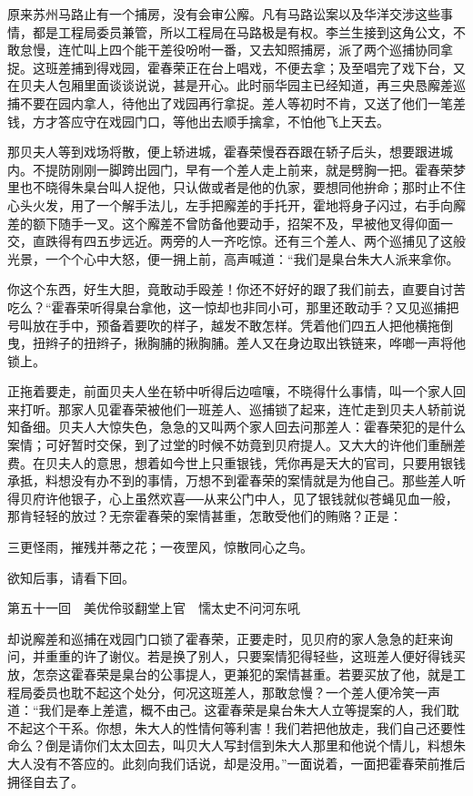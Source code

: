 \documentclass[12pt,UTF8]{ctexbook}
\begin{document}
{{{原来苏州马路止有一个捕房，没有会审公廨。凡有马路讼案以及华洋交涉这些事情，都是工程局委员兼管，所以工程局在马路极是有权。李兰生接到这角公文，不敢怠慢，连忙叫上四个能干差役吩咐一番，又去知照捕房，派了两个巡捕协同拿捉。这班差捕到得戏园，霍春荣正在台上唱戏，不便去拿；及至唱完了戏下台，又在贝夫人包厢里面谈谈说说，甚是开心。此时丽华园主已经知道，再三央恳廨差巡捕不要在园内拿人，待他出了戏园再行拿捉。差人等初时不肯，又送了他们一笔差钱，方才答应守在戏园门口，等他出去顺手擒拿，不怕他飞上天去。

那贝夫人等到戏场将散，便上轿进城，霍春荣慢吞吞跟在轿子后头，想要跟进城内。不提防刚刚一脚跨出园门，早有一个差人走上前来，就是劈胸一把。霍春荣梦里也不晓得朱臬台叫人捉他，只认做或者是他的仇家，要想同他拚命；那时止不住心头火发，用了一个解手法儿，左手把廨差的手托开，霍地将身子闪过，右手向廨差的额下随手一叉。这个廨差不曾防备他要动手，招架不及，早被他叉得仰面一交，直跌得有四五步远近。两旁的人一齐吃惊。还有三个差人、两个巡捕见了这般光景，一个个心中大怒，便一拥上前，高声喊道：“我们是臬台朱大人派来拿你。

你这个东西，好生大胆，竟敢动手殴差！你还不好好的跟了我们前去，直要自讨苦吃么？“霍春荣听得臬台拿他，这一惊却也非同小可，那里还敢动手？又见巡捕把号叫放在手中，预备着要吹的样子，越发不敢怎样。凭着他们四五人把他横拖倒曳，扭辫子的扭辫子，揪胸脯的揪胸脯。差人又在身边取出铁链来，哗啷一声将他锁上。

正拖着要走，前面贝夫人坐在轿中听得后边喧嚷，不晓得什么事情，叫一个家人回来打听。那家人见霍春荣被他们一班差人、巡捕锁了起来，连忙走到贝夫人轿前说知备细。贝夫人大惊失色，急急的又叫两个家人回去问那差人：霍春荣犯的是什么案情；可好暂时交保，到了过堂的时候不妨竟到贝府提人。又大大的许他们重酬差费。在贝夫人的意思，想着如今世上只重银钱，凭你再是天大的官司，只要用银钱承抵，料想没有办不到的事情，万想不到霍春荣的案情就是为他自己。那些差人听得贝府许他银子，心上虽然欢喜──从来公门中人，见了银钱就似苍蝇见血一般，那肯轻轻的放过？无奈霍春荣的案情甚重，怎敢受他们的贿赂？正是：

三更怪雨，摧残并蒂之花；一夜罡风，惊散同心之鸟。

欲知后事，请看下回。





第五十一回　美优伶驳翻堂上官　懦太史不问河东吼





却说廨差和巡捕在戏园门口锁了霍春荣，正要走时，见贝府的家人急急的赶来询问，并重重的许了谢仪。若是换了别人，只要案情犯得轻些，这班差人便好得钱买放，怎奈这霍春荣是臬台的公事提人，更兼犯的案情甚重。若要买放了他，就是工程局委员也耽不起这个处分，何况这班差人，那敢怠慢？一个差人便冷笑一声道：“我们是奉上差遣，概不由己。这霍春荣是臬台朱大人立等提案的人，我们耽不起这个干系。你想，朱大人的性情何等利害！我们若把他放走，我们自己还要性命么？倒是请你们太太回去，叫贝大人写封信到朱大人那里和他说个情儿，料想朱大人没有不答应的。此刻向我们话说，却是没用。”一面说着，一面把霍春荣前推后拥径自去了。

}}}
\end{document}
